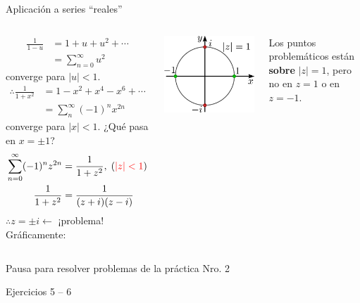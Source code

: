 \documentclass[9pt, aspectratio=169]{beamer}
\begin{document}
\begin{frame}{Aplicación a series ``reales''}
    \begin{columns}[c]
    \begin{align*}
    \frac{1}{1 - u} &= 1 + u + u^2 + \cdots \\
                    &= \sum_{n = 0}^{\infty} u^2
    \end{align*}
    converge para $|u| < 1$.
    \begin{align*}
    \therefore \frac{1}{1 + x^2} &= 1 - x^2 + x^4 - x^6 + \cdots \\
                                 &= \sum_{n}^{\infty} (-1)^n x^{2n}
    \end{align*}
    converge para $|x| < 1$.
    ¿Qué pasa en $x = \pm 1$?
    \begin{align*}
        \sum_{n = 0}^{\infty} (-1)^n z^{2n} &= \frac{1}{1 + z^2}, \; ({\color{red}|z| < 1}) \\
    \frac{1}{1 + z^2} &= \frac{1}{(z + i)(z -i)}
    \end{align*}
$\therefore z = \pm i \leftarrow $ \alert{¡problema!}
    Gráficamente:
    \begin{center}
    \includegraphics[scale=0.40]{figs/fig-14.pdf}
    \end{center}
    Los puntos problemáticos están \textbf{sobre} $|z| = 1$, pero no en $z = 1$ o en $z = -1$.
    \end{columns}
\end{frame}

\begin{frame}[standout]
Pausa para resolver problemas de la práctica Nro. 2

Ejercicios 5 -- 6
\end{frame}
\end{document}

